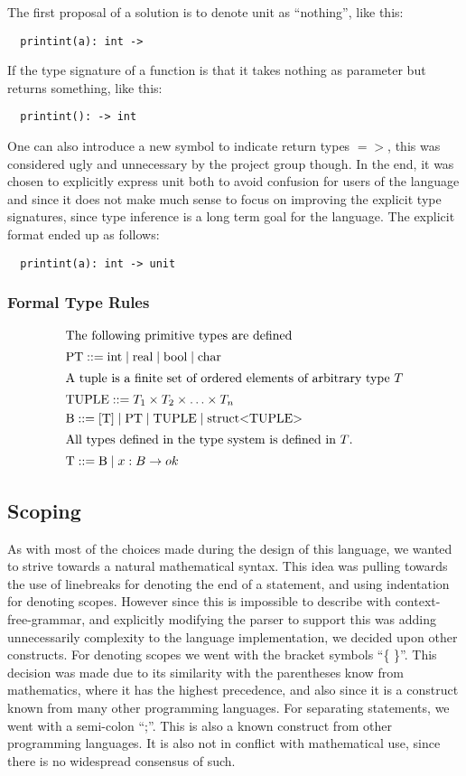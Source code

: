 The first proposal of a solution is to denote unit as \enquote{nothing}, like this:
\begin{verbatim}
  printint(a): int ->
\end{verbatim}
If the type signature of a function is that it takes nothing as parameter but returns something, like this:
\begin{verbatim}
  printint(): -> int
\end{verbatim}

One can also introduce a new symbol to indicate return types $=>$, this was considered ugly and unnecessary by the project group though. In the end, it was chosen to explicitly express unit both to avoid confusion for users of the language and since it does not make much sense to focus on improving the explicit type signatures, since type inference is a long term goal for the language. The explicit format ended up as follows:
\begin{verbatim}
  printint(a): int -> unit
\end{verbatim}

\subsubsection{Formal Type Rules}

\begin{align*}
\intertext{The following primitive types are defined}
&\text{PT} ::= \text{int} \mid \text{real} \mid \text{bool} \mid \text{char}
\\
\intertext{A tuple is a finite set of ordered elements of arbitrary type $T$}
&\text{TUPLE} ::= T_1 \times T_2 \times \ldots \times T_n
\\            
&\text{B} ::=  \left[ \text{T} \right] \mid \text{PT} \mid \text{TUPLE} \mid \text{struct<TUPLE>}
\\            
\intertext{All types defined in the type system is defined in $T$.}
&\text{T} ::= \text{B} \mid x : B \rightarrow ok
\end{align*}

\subsection{Scoping}

As with most of the choices made during the design of this language, we wanted to strive towards a natural mathematical syntax. This idea was pulling towards the use of linebreaks for denoting the end of a statement, and using indentation for denoting scopes. However since this is impossible to describe with context-free-grammar, and explicitly modifying the parser to support this was adding unnecessarily complexity to the language implementation, we decided upon other constructs.
For denoting scopes we went with the bracket symbols \enquote{\{ \}}. This decision was made due to its similarity with the parentheses know from mathematics, where it has the highest precedence, and also since it is a construct known from many other programming languages. For separating statements, we went with a semi-colon \enquote{;}. This is also a known construct from other programming languages. It is also not in conflict with mathematical use, since there is no widespread consensus of such.


